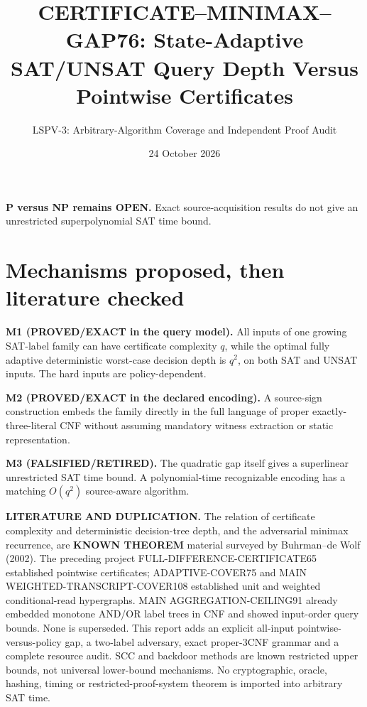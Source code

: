\documentclass[11pt]{article}
\title{CERTIFICATE--MINIMAX--GAP76: State-Adaptive SAT/UNSAT Query Depth Versus Pointwise Certificates}
\author{LSPV-3: Arbitrary-Algorithm Coverage and Independent Proof Audit}
\date{24 October 2026}
\begin{document}
\maketitle
\begin{center}\textbf{P versus NP remains OPEN.} Exact source-acquisition results do not give an unrestricted superpolynomial SAT time bound.\end{center}

\section{Mechanisms proposed, then literature checked}
\noindent\textbf{M1 (PROVED/EXACT in the query model).} All inputs of one growing SAT-label family can have certificate complexity $q$, while the optimal fully adaptive deterministic worst-case decision depth is $q^2$, on both SAT and UNSAT inputs. The hard inputs are policy-dependent.

\par\noindent\textbf{M2 (PROVED/EXACT in the declared encoding).} A source-sign construction embeds the family directly in the full language of proper exactly-three-literal CNF without assuming mandatory witness extraction or static representation.

\par\noindent\textbf{M3 (FALSIFIED/RETIRED).} The quadratic gap itself gives a superlinear unrestricted SAT time bound. A polynomial-time recognizable encoding has a matching $O(q^2)$ source-aware algorithm.

\par\noindent\textbf{LITERATURE AND DUPLICATION.} The relation of certificate complexity and deterministic decision-tree depth, and the adversarial minimax recurrence, are \textbf{KNOWN THEOREM} material surveyed by Buhrman--de Wolf (2002). The preceding project FULL-DIFFERENCE-CERTIFICATE65 established pointwise certificates; ADAPTIVE-COVER75 and MAIN WEIGHTED-TRANSCRIPT-COVER108 established unit and weighted conditional-read hypergraphs. MAIN AGGREGATION-CEILING91 already embedded monotone AND/OR label trees in CNF and showed input-order query bounds. None is superseded. This report adds an explicit all-input pointwise-versus-policy gap, a two-label adversary, exact proper-3CNF grammar and a complete resource audit. SCC and backdoor methods are known restricted upper bounds, not universal lower-bound mechanisms. No cryptographic, oracle, hashing, timing or restricted-proof-system theorem is imported into arbitrary SAT time.
\end{document}
